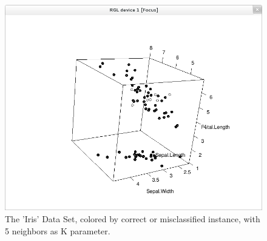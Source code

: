 \documentclass[paper=a4, fontsize=11pt]{scrartcl} %
\numberwithin{equation}{section} %
\numberwithin{figure}{section} %
\numberwithin{table}{section} %
\begin{document}
\begin{figure}[\textwidth]
    \begin{center}
\includegraphics[width=\textwidth]{Iris_correct_k5}
    \end{center}
\caption['Iris' correctness with k=5]{The 'Iris' Data Set, colored by correct or misclassified instance, with 5 neighbors as K parameter.}
\label{fig:iris:correct:k5}
\end{figure}
\end{document}
